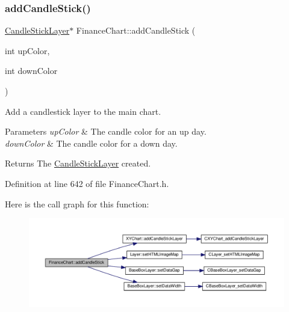 \subsubsection{\texorpdfstring{add\+Candle\+Stick()}{addCandleStick()}}
{\footnotesize\ttfamily \hyperlink{class_candle_stick_layer}{Candle\+Stick\+Layer}$\ast$ Finance\+Chart\+::add\+Candle\+Stick (\begin{DoxyParamCaption}\item[{int}]{up\+Color,  }\item[{int}]{down\+Color }\end{DoxyParamCaption})\hspace{0.3cm}{\ttfamily [inline]}}



Add a candlestick layer to the main chart. 


\begin{DoxyParams}{Parameters}
{\em up\+Color} & The candle color for an up day.\\
\hline
{\em down\+Color} & The candle color for a down day.\\
\hline
\end{DoxyParams}
\begin{DoxyReturn}{Returns}
The \hyperlink{class_candle_stick_layer}{Candle\+Stick\+Layer} created.
\end{DoxyReturn}


Definition at line 642 of file Finance\+Chart.\+h.

Here is the call graph for this function\+:
\nopagebreak
\begin{figure}[H]
\begin{center}
\leavevmode
\includegraphics[width=350pt]{class_finance_chart_a84a4d29a87d57f817b52387e8495a986_cgraph}
\end{center}
\end{figure}
\mbox{\label{class_finance_chart_a1841d99b6f71cafd6207f18a57d5b5d7}} 
